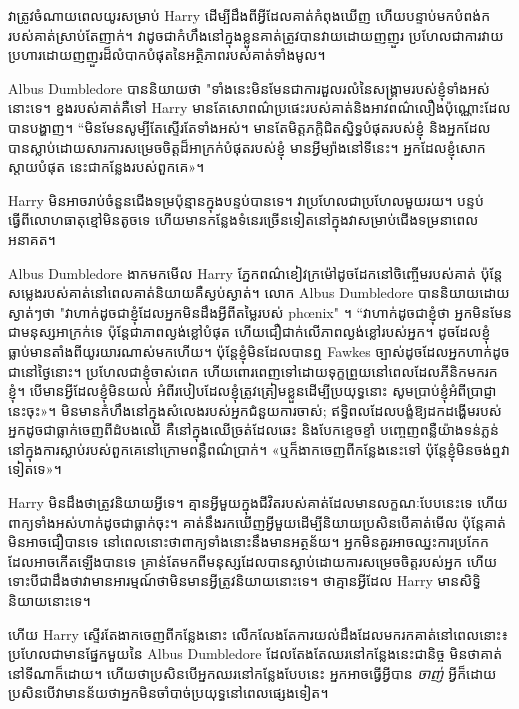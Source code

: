 {វាត្រូវចំណាយពេលយូរសម្រាប់ Harry ដើម្បីដឹងពីអ្វីដែលគាត់កំពុងឃើញ ហើយបន្ទាប់មកបំពង់ករបស់គាត់ស្រាប់តែញាក់។ វាដូចជាកំហឹងនៅក្នុងខ្លួនគាត់ត្រូវបានវាយដោយញញួរ ប្រហែលជាការវាយប្រហារដោយញញួរដ៏លំបាកបំផុតនៃអត្ថិភាពរបស់គាត់ទាំងមូល។

Albus Dumbledore បាននិយាយថា "ទាំងនេះមិនមែនជាការដួលរលំនៃសង្រ្គាមរបស់ខ្ញុំទាំងអស់នោះទេ។ ខ្នងរបស់គាត់គឺទៅ Harry មានតែសោពណ៌ប្រផេះរបស់គាត់និងអាវពណ៌លឿងប៉ុណ្ណោះដែលបានបង្ហាញ។ “មិន​មែន​សូម្បី​តែ​ស្ទើរ​តែ​ទាំង​អស់។ មានតែមិត្តភក្តិជិតស្និទ្ធបំផុតរបស់ខ្ញុំ និងអ្នកដែលបានស្លាប់ដោយសារការសម្រេចចិត្តដ៏អាក្រក់បំផុតរបស់ខ្ញុំ មានអ្វីម្យ៉ាងនៅទីនេះ។ អ្នក​ដែល​ខ្ញុំ​សោកស្ដាយ​បំផុត នេះ​ជា​កន្លែង​របស់​ពួកគេ»។

Harry មិន​អាច​រាប់​ចំនួន​ជើង​ទម្រ​ប៉ុន្មាន​ក្នុង​បន្ទប់​បាន​ទេ។ វាប្រហែលជាប្រហែលមួយរយ។ បន្ទប់ធ្វើពីលោហធាតុខ្មៅមិនតូចទេ ហើយមានកន្លែងទំនេរច្រើនទៀតនៅក្នុងវាសម្រាប់ជើងទម្រនាពេលអនាគត។

Albus Dumbledore ងាកមកមើល Harry ភ្នែកពណ៌ខៀវក្រម៉ៅដូចដែកនៅចិញ្ចើមរបស់គាត់ ប៉ុន្តែសម្លេងរបស់គាត់នៅពេលគាត់និយាយគឺស្ងប់ស្ងាត់។ លោក Albus Dumbledore បាននិយាយដោយស្ងាត់ៗថា "វាហាក់ដូចជាខ្ញុំដែលអ្នកមិនដឹងអ្វីពីតម្លៃរបស់ phœnix" ។ “វាហាក់ដូចជាខ្ញុំថា អ្នកមិនមែនជាមនុស្សអាក្រក់ទេ ប៉ុន្តែជាភាពល្ងង់ខ្លៅបំផុត ហើយជឿជាក់លើភាពល្ងង់ខ្លៅរបស់អ្នក។ ដូចដែលខ្ញុំធ្លាប់មានតាំងពីយូរយារណាស់មកហើយ។ ប៉ុន្តែ​ខ្ញុំ​មិន​ដែល​បាន​ឮ Fawkes ច្បាស់​ដូច​ដែល​អ្នក​ហាក់​ដូច​ជា​នៅ​ថ្ងៃ​នោះ​។ ប្រហែល​ជា​ខ្ញុំ​ចាស់​ពេក ហើយ​ពោរពេញ​ទៅ​ដោយ​ទុក្ខ​ព្រួយ​នៅ​ពេល​ដែល​ភីនិក​មក​រក​ខ្ញុំ។ បើ​មាន​អ្វី​ដែល​ខ្ញុំ​មិន​យល់ អំពី​របៀប​ដែល​ខ្ញុំ​ត្រូវ​ត្រៀម​ខ្លួន​ដើម្បី​ប្រយុទ្ធ​នោះ សូម​ប្រាប់​ខ្ញុំ​អំពី​ប្រាជ្ញា​នេះ​ចុះ»។ មិនមានកំហឹងនៅក្នុងសំលេងរបស់អ្នកជំនួយការចាស់; ឥទ្ធិពលដែលបង្ខំឱ្យដកដង្ហើមរបស់អ្នកដូចជាធ្លាក់ចេញពីដំបងឈើ គឺនៅក្នុងឈើច្រត់ដែលឆេះ និងបែកខ្ទេចខ្ទាំ បញ្ចេញពន្លឺយ៉ាងទន់ភ្លន់នៅក្នុងការស្លាប់របស់ពួកគេនៅក្រោមពន្លឺពណ៌ប្រាក់។ «ឬ​ក៏​ងាក​ចេញ​ពី​កន្លែង​នេះ​ទៅ ប៉ុន្តែ​ខ្ញុំ​មិន​ចង់​ឮ​វា​ទៀត​ទេ»។

Harry មិនដឹងថាត្រូវនិយាយអ្វីទេ។ គ្មាន​អ្វី​មួយ​ក្នុង​ជីវិត​របស់​គាត់​ដែល​មាន​លក្ខណៈ​បែប​នេះ​ទេ ហើយ​ពាក្យ​ទាំង​អស់​ហាក់​ដូច​ជា​ធ្លាក់​ចុះ។ គាត់​នឹង​រក​ឃើញ​អ្វី​មួយ​ដើម្បី​និយាយ​ប្រសិន​បើ​គាត់​មើល ប៉ុន្តែ​គាត់​មិន​អាច​ជឿ​បាន​ទេ នៅ​ពេល​នោះ​ថា​ពាក្យ​ទាំង​នោះ​នឹង​មាន​អត្ថន័យ។ អ្នក​មិន​គួរ​អាច​ឈ្នះ​ការ​ប្រកែក​ដែល​អាច​កើត​ឡើង​បាន​ទេ គ្រាន់​តែ​មក​ពី​មនុស្ស​ដែល​បាន​ស្លាប់​ដោយ​ការ​សម្រេច​ចិត្ត​របស់​អ្នក ហើយ​ទោះ​បី​ជា​ដឹង​ថា​វា​មាន​អារម្មណ៍​ថា​មិន​មាន​អ្វី​ត្រូវ​និយាយ​នោះ​ទេ។ ថាគ្មានអ្វីដែល Harry មានសិទ្ធិនិយាយនោះទេ។

ហើយ Harry ស្ទើរតែងាកចេញពីកន្លែងនោះ លើកលែងតែការយល់ដឹងដែលមករកគាត់នៅពេលនោះ៖ ប្រហែលជាមានផ្នែកមួយនៃ Albus Dumbledore ដែលតែងតែឈរនៅកន្លែងនេះជានិច្ច មិនថាគាត់នៅទីណាក៏ដោយ។ ហើយថាប្រសិនបើអ្នកឈរនៅកន្លែងបែបនេះ អ្នកអាចធ្វើអ្វីបាន \emph{ចាញ់} អ្វីក៏ដោយ ប្រសិនបើវាមានន័យថាអ្នកមិនចាំបាច់ប្រយុទ្ធនៅពេលផ្សេងទៀត។

}
